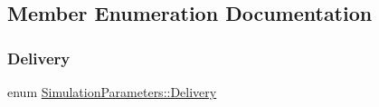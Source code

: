 \subsection{Member Enumeration Documentation}
\mbox{\label{classSimulationParameters_ae08444273809241f502aa422205f7307}} 
\subsubsection{\texorpdfstring{Delivery}{Delivery}}
{\footnotesize\ttfamily enum \hyperlink{classSimulationParameters_ae08444273809241f502aa422205f7307}{Simulation\+Parameters\+::\+Delivery}\hspace{0.3cm}{\ttfamily [strong]}}

